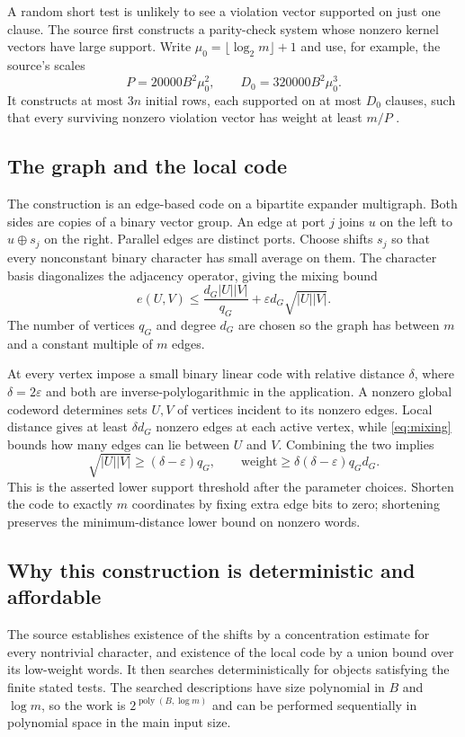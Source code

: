 \documentclass[11pt,a4paper]{article}
\numberwithin{equation}{section}
\theoremstyle{definition}
\theoremstyle{remark}
\newcommand{\eps}{\varepsilon}
\newcommand{\poly}{\operatorname{poly}}
\begin{document}
A random short test is unlikely to see a violation vector supported on just
one clause. The source first constructs a parity-check system whose nonzero
kernel vectors have large support. Write
$\mu_0=\lfloor\log_2m\rfloor+1$ and use, for example, the source's scales
\[
 P=20000B^2\mu_0^2,\qquad D_0=320000B^2\mu_0^3.
\]
It constructs at most $3n$ initial rows, each supported on at most $D_0$
clauses, such that every surviving nonzero violation vector has weight at
least $m/P$ \cite{paper}.

\subsection{The graph and the local code}
The construction is an edge-based code on a bipartite expander multigraph.
Both sides are copies of a binary vector group. An edge at port $j$ joins
$u$ on the left to $u\oplus s_j$ on the right. Parallel edges are distinct
ports. Choose shifts $s_j$ so that every nonconstant binary character has
small average on them. The character basis diagonalizes the adjacency
operator, giving the mixing bound
\begin{equation}\label{eq:mixing}
 e(U,V)\le \frac{d_G|U||V|}{q_G}
              +\eps d_G\sqrt{|U||V|}.
\end{equation}
The number of vertices $q_G$ and degree $d_G$ are chosen so the graph has
between $m$ and a constant multiple of $m$ edges.

At every vertex impose a small binary linear code with relative distance
$\delta$, where $\delta=2\eps$ and both are inverse-polylogarithmic in the
application. A nonzero global codeword determines sets $U,V$ of vertices
incident to its nonzero edges. Local distance gives at least $\delta d_G$
nonzero edges at each active vertex, while \eqref{eq:mixing} bounds how many
edges can lie between $U$ and $V$. Combining the two implies
\[
 \sqrt{|U||V|}\ge(\delta-\eps)q_G,
 \qquad
 \text{weight}\ge\delta(\delta-\eps)q_Gd_G.
\]
This is the asserted lower support threshold after the parameter choices.
Shorten the code to exactly $m$ coordinates by fixing extra edge bits to zero;
shortening preserves the minimum-distance lower bound on nonzero words.

\subsection{Why this construction is deterministic and affordable}
The source establishes existence of the shifts by a concentration estimate
for every nontrivial character, and existence of the local code by a union
bound over its low-weight words. It then searches deterministically for
objects satisfying the finite stated tests. The searched descriptions have
size polynomial in $B$ and $\log m$, so the work is
$2^{\poly(B,\log m)}$ and can be performed sequentially in polynomial space
in the main input size.
\end{document}
